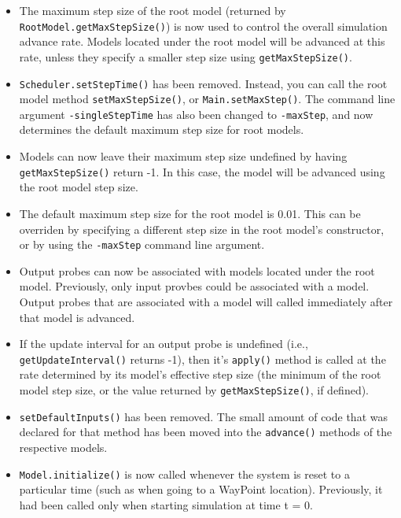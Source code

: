 \documentclass{article}
\begin{document}
\begin{itemize}

\item The maximum step size of the root model (returned by
  {\tt RootModel.getMaxStepSize()}) is now used to control the overall
  simulation advance rate. Models located under the root model will be
  advanced at this rate, unless they specify a smaller step size using
  {\tt getMaxStepSize()}.

\item {\tt Scheduler.setStepTime()} has been removed. Instead, you can call
  the root model method {\tt setMaxStepSize()}, or {\tt Main.setMaxStep()}.
  The command line argument {\tt -singleStepTime} has also been changed to
  {\tt -maxStep}, and now determines the default maximum step size for
  root models.

\item Models can now leave their maximum step size undefined by having
  {\tt getMaxStepSize()} return -1. In this case, the model will be
  advanced using the root model step size.

\item The default maximum step size for the root model is 0.01. This can
  be overriden by specifying a different step size in the root model's
  constructor, or by using the {\tt -maxStep} command line argument.

\item Output probes can now be associated with models located under the
  root model. Previously, only input provbes could be associated with
  a model. Output probes that are associated with a model will called
  immediately after that model is advanced.

\item If the update interval for an output probe is undefined (i.e.,
  {\tt getUpdateInterval()} returns -1), then it's {\tt apply()} method is
  called at the rate determined by its model's effective step size
  (the minimum of the root model step size, or the value returned by
  {\tt getMaxStepSize()}, if defined).

\item {\tt setDefaultInputs()} has been removed. The small amount of code that
  was declared for that method has been moved into the {\tt advance()}
  methods of the respective models.
  
\item {\tt Model.initialize()} is now called whenever the system is reset to a
  particular time (such as when going to a WayPoint
  location). Previously, it had been called only when starting
  simulation at time t = 0.

\end{itemize}
\end{document}
